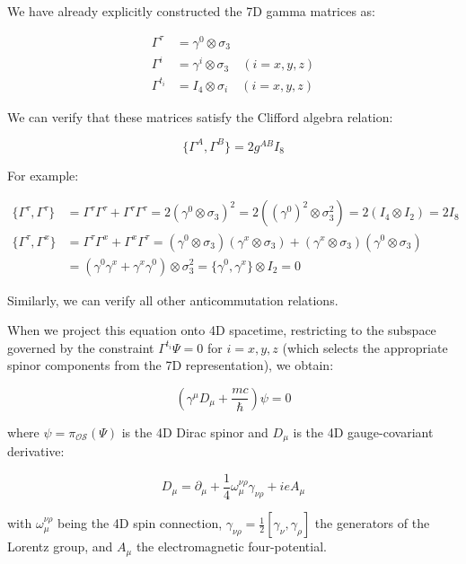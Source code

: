 \documentclass{article}
\begin{document}
We have already explicitly constructed the 7D gamma matrices as:

\begin{align}
\Gamma^\tau &= \gamma^0 \otimes \sigma_3 \\
\Gamma^i &= \gamma^i \otimes \sigma_3 \quad (i = x, y, z) \\
\Gamma^{t_i} &= I_4 \otimes \sigma_i \quad (i = x, y, z)
\end{align}

We can verify that these matrices satisfy the Clifford algebra relation:

\begin{equation}
\{\Gamma^A, \Gamma^B\} = 2g^{AB}I_8
\end{equation}

For example:

\begin{align}
\{\Gamma^\tau, \Gamma^\tau\} &= \Gamma^\tau\Gamma^\tau + \Gamma^\tau\Gamma^\tau = 2(\gamma^0 \otimes \sigma_3)^2 = 2((\gamma^0)^2 \otimes \sigma_3^2) = 2(I_4 \otimes I_2) = 2I_8 \\
\{\Gamma^\tau, \Gamma^x\} &= \Gamma^\tau\Gamma^x + \Gamma^x\Gamma^\tau = (\gamma^0 \otimes \sigma_3)(\gamma^x \otimes \sigma_3) + (\gamma^x \otimes \sigma_3)(\gamma^0 \otimes \sigma_3) \\
&= (\gamma^0\gamma^x + \gamma^x\gamma^0) \otimes \sigma_3^2 = \{\gamma^0, \gamma^x\} \otimes I_2 = 0
\end{align}

Similarly, we can verify all other anticommutation relations.

When we project this equation onto 4D spacetime, restricting to the subspace governed by the constraint $\Gamma^{t_i} \Psi = 0$ for $i = x, y, z$ (which selects the appropriate spinor components from the 7D representation), we obtain:

\begin{equation}
\left(\gamma^\mu D_\mu + \frac{mc}{\hbar}\right) \psi = 0
\end{equation}

where $\psi = \pi_{\mathcal{OS}}(\Psi)$ is the 4D Dirac spinor and $D_\mu$ is the 4D gauge-covariant derivative:

\begin{equation}
D_\mu = \partial_\mu + \frac{1}{4}\omega_\mu^{\nu\rho}\gamma_{\nu\rho} + ieA_\mu
\end{equation}

with $\omega_\mu^{\nu\rho}$ being the 4D spin connection, $\gamma_{\nu\rho} = \frac{1}{2}[\gamma_\nu, \gamma_\rho]$ the generators of the Lorentz group, and $A_\mu$ the electromagnetic four-potential.
\end{document}
